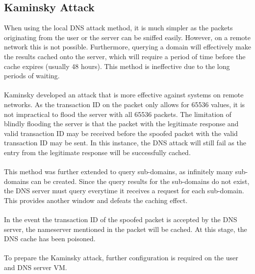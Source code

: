 \documentclass[a4paper,12pt]{article}
\begin{document}
		\subsection{Kaminsky Attack}
		When using the local DNS attack method, it is much simpler as the packets originating from the user or the server can be sniffed easily. However, on a remote network this is not possible. Furthermore, querying a domain will effectively make the results cached onto the server, which will require a period of time before the cache expires (usually 48 hours). This method is ineffective due to the long periods of waiting.\\\\Kaminsky developed an attack that is more effective against systems on remote networks. As the transaction ID on the packet only allows for 65536 values, it is not impractical to flood the server with all 65536 packets. The limitation of blindly flooding the server is that the packet with the legitimate response and valid transaction ID may be received before the spoofed packet with the valid transaction ID may be sent. In this instance, the DNS attack will still fail as the entry from the legitimate response will be successfully cached.\\\\This method was further extended to query sub-domains, as infinitely many sub-domains can be created. Since the query results for the sub-domains do not exist, the DNS server must query everytime it receives a request for each sub-domain. This provides another window and defeats the caching effect.\\\\In the event the transaction ID of the spoofed packet is accepted by the DNS server, the nameserver mentioned in the packet will be cached. At this stage, the DNS cache has been poisoned.
		\\\\To prepare the Kaminsky attack, further configuration is required on the user and DNS server VM.
\end{document}
